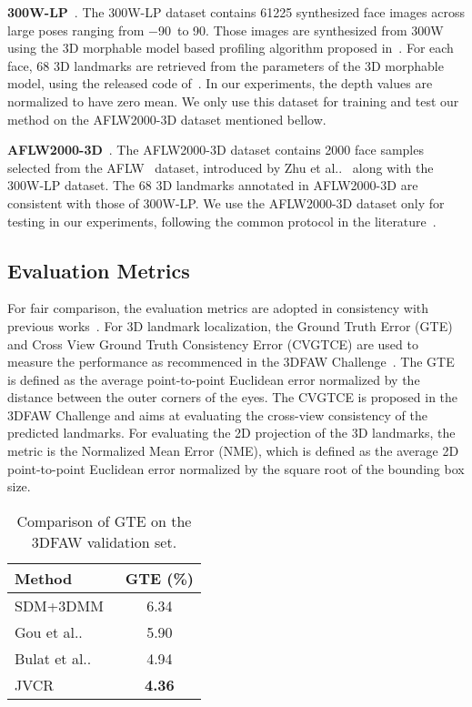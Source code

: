 \documentclass[a4paper,conference]{IEEEtran}
\makeatletter
\DeclareRobustCommand\onedot{\futurelet\@let@token\@onedot}
\def\@onedot{\ifx\@let@token.\else.\null\fi\xspace}
\def\etal{{et al}\onedot}
\makeatother
\begin{document}
\textbf{300W-LP}~\cite{zhu2016face}. The 300W-LP dataset contains 61225 synthesized face images across large poses ranging from $-$90\degree~to 90\degree. 
Those images are synthesized from 300W~\cite{sagonas2013300} using the 3D morphable model based profiling algorithm proposed in~\cite{zhu2016face}.
For each face, 68 3D landmarks are retrieved from the parameters of the 3D morphable model, using the released code of~\cite{zhu2016face}.
In our experiments, the depth values are normalized to have zero mean.
We only use this dataset for training and test our method on the AFLW2000-3D dataset mentioned bellow.

\textbf{AFLW2000-3D}~\cite{zhu2016face}. The AFLW2000-3D dataset contains 2000 face samples selected from the AFLW~\cite{kostinger2011annotated} dataset, introduced by Zhu \etal~\cite{zhu2016face} along with the 300W-LP dataset.
The 68 3D landmarks annotated in AFLW2000-3D are consistent with those of 300W-LP.
We use the AFLW2000-3D dataset only for testing in our experiments, following the common protocol in the literature~\cite{zhu2016face,Bhagavatula2017Faster}.

\subsection{Evaluation Metrics}
For fair comparison, the evaluation metrics are adopted in consistency with previous works~\cite{jeni2016first,zhu2016face}.
For 3D landmark localization, the Ground Truth Error (GTE) and Cross View Ground Truth Consistency Error (CVGTCE) are used to measure the performance as recommenced in the 3DFAW Challenge~\cite{jeni2016first}. 
The GTE is defined as the average point-to-point Euclidean error normalized by the distance between the outer corners of the eyes.
The CVGTCE is proposed in the 3DFAW Challenge and aims at evaluating the cross-view consistency of the predicted landmarks.
For evaluating the 2D projection of the 3D landmarks, the metric is the Normalized Mean Error (NME), which is defined as the average 2D point-to-point Euclidean error normalized by the square root of the bounding box size. 


\begin{table}[h]
	\centering
	\caption{Comparison of GTE on the 3DFAW validation set. }
	\begin{tabular}{lc}
		\toprule
		Method & GTE (\%) \\
		\midrule
		SDM+3DMM~\cite{gou2016shape} & 6.34 \\
		Gou \etal~\cite{gou2016shape} & 5.90 \\
		Bulat \etal~\cite{bulat2016two} & 4.94 \\
		\midrule
		JVCR  & \bf 4.36 \\
		\bottomrule
	\end{tabular}\label{tab:cmp3DFAWvalid}\end{table}
\end{document}
